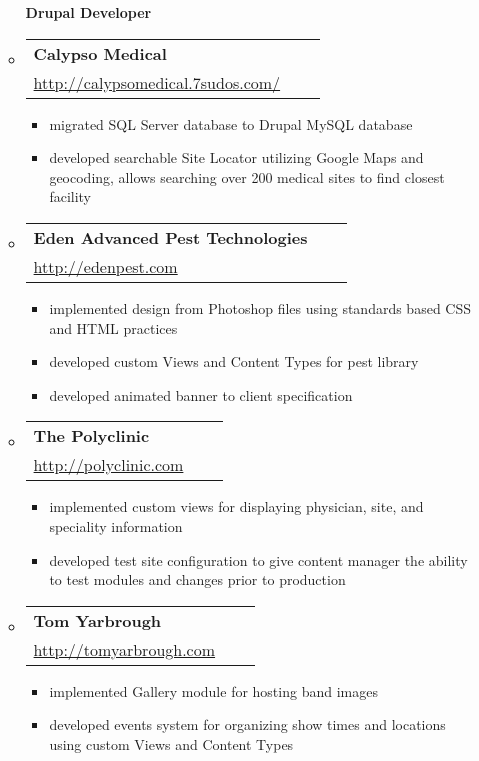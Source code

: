 \documentclass[11pt]{article}
\begin{document}
\begin{itemize}
\begin{itemize}
    \vspace{0.05in}
    \textbf{Drupal Developer} 
    
    \vspace{0.05in}
  \item \begin{tabular*}{5.65in}{lcr}
      \textbf{Calypso Medical}\\
      \url{http://calypsomedical.7sudos.com/} 
    \end{tabular*}
    \begin{itemize}
    \item migrated SQL Server database to Drupal MySQL database
    \item developed searchable Site Locator utilizing Google Maps and geocoding, allows searching over 200 medical sites to find closest facility
    \end {itemize}
    
  \item \begin{tabular*}{5.65in}{lcr}
      \textbf{Eden Advanced Pest Technologies} \\
      \url{http://edenpest.com} 
    \end{tabular*}
    \begin{itemize}
    \item implemented design from Photoshop files using standards based CSS and HTML practices
    \item developed custom Views and Content Types for pest library
    \item developed animated banner to client specification
    \end{itemize}
    
  \item \begin{tabular*}{5.65in}{lcr}
      \textbf{The Polyclinic} \\
      \url{http://polyclinic.com} 
    \end{tabular*}
    \begin{itemize}
    \item implemented custom views for displaying physician, site, and speciality information
    \item developed test site configuration to give content manager the ability to test modules and changes prior to production
    \end{itemize}
    
  \item \begin{tabular*}{5.65in}{lcr} 
      \textbf{Tom Yarbrough} \\
      \url{http://tomyarbrough.com} 
    \end{tabular*}
    \begin{itemize}
    \item implemented Gallery module for hosting band images
    \item developed events system for organizing show times and locations using custom Views and Content Types
    \end{itemize}
    

\end{itemize}
\end{itemize}
\end{document}
